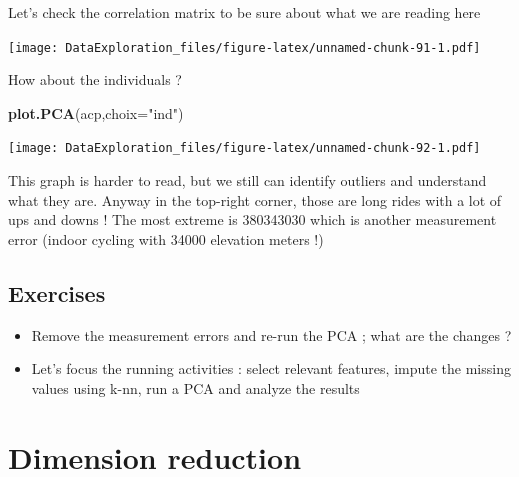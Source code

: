 \documentclass[
]{book}
\newenvironment{Shaded}{\begin{snugshade}}{\end{snugshade}}
\newcommand{\DataTypeTok}[1]{\textcolor[rgb]{0.13,0.29,0.53}{#1}}
\newcommand{\KeywordTok}[1]{\textcolor[rgb]{0.13,0.29,0.53}{\textbf{#1}}}
\newcommand{\NormalTok}[1]{#1}
\newcommand{\OperatorTok}[1]{\textcolor[rgb]{0.81,0.36,0.00}{\textbf{#1}}}
\newcommand{\StringTok}[1]{\textcolor[rgb]{0.31,0.60,0.02}{#1}}
\providecommand{\tightlist}{%
  \setlength{\itemsep}{0pt}\setlength{\parskip}{0pt}}
\begin{document}
Let's check the correlation matrix to be sure about what we are reading here

\begin{Shaded}
\end{Shaded}

\texttt{[image: DataExploration\_files/figure-latex/unnamed-chunk-91-1.pdf]}

How about the individuals ?

\begin{Shaded}
\begin{Highlighting}[]
\KeywordTok{plot.PCA}\NormalTok{(acp,}\DataTypeTok{choix=}\StringTok{"ind"}\NormalTok{)}
\end{Highlighting}
\end{Shaded}

\texttt{[image: DataExploration\_files/figure-latex/unnamed-chunk-92-1.pdf]}

This graph is harder to read, but we still can identify outliers and understand what they are. Anyway in the top-right corner, those are long rides with a lot of ups and downs ! The most extreme is 380343030 which is another measurement error (indoor cycling with 34000 elevation meters !)

\hypertarget{exercises}{%
\subsection{Exercises}\label{exercises}}

\begin{itemize}
\tightlist
\item
  Remove the measurement errors and re-run the PCA ; what are the changes ?
\item
  Let's focus the running activities : select relevant features, impute the missing values using k-nn, run a PCA and analyze the results
\end{itemize}

\hypertarget{dimension-reduction}{%
\section{Dimension reduction}\label{dimension-reduction}}
\end{document}
